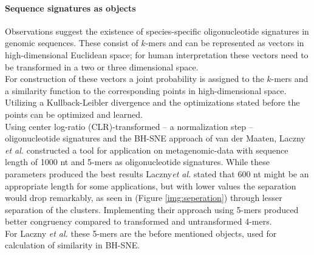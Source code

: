 \documentclass[twocolumn]{bmcart}%
\begin{document}
\paragraph*{Sequence signatures as objects}
Observations suggest the existence of species-specific oligonucleotide signatures in genomic sequences\cite{Laczny2014,Cheng1194}. These consist of $k$-mers and can be represented as vectors in high-dimensional Euclidean space; for human interpretation these vectors need to be transformed in a two or three dimensional space\cite{Laczny2014}.\\
For construction of these vectors a joint probability is assigned to the $k$-mers and a similarity function to the corresponding points in high-dimensional space. Utilizing a Kullback-Leibler divergence and the optimizations stated before the points can be optimized and learned.\\
Using center log-ratio (CLR)-transformed -- a normalization step -- oligonucleotide signatures and the BH-SNE approach of van der Maaten, Laczny \textit{et al.} constructed a tool for application on metagenomic-data with sequence length of 1000 nt and 5-mers as oligonucleotide signatures. While these parameters produced the best results Laczny\textit{et al.} stated that 600 nt might be an appropriate length for some applications, but with lower values the separation would drop remarkably, as seen in (Figure  \ref{img:seperation}) through lesser separation of the clusters. Implementing their approach using 5-mers produced better congruency compared to transformed and untransformed 4-mers.\\
For Laczny \textit{et al.} these 5-mers are the before mentioned objects, used for calculation of similarity in BH-SNE.
\end{document}
